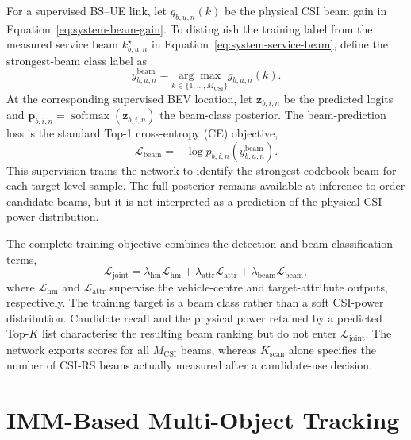 For a supervised BS--UE link, let \(g_{b,u,n}(k)\) be the physical CSI beam gain
in Equation~\eqref{eq:system-beam-gain}.  To distinguish the training label from
the measured service beam \(k^{\star}_{b,u,n}\) in
Equation~\eqref{eq:system-service-beam}, define the strongest-beam class label as
\begin{equation}
    y^{\mathrm{beam}}_{b,u,n}
    =
    \underset{k\in\{1,\ldots,M_{\mathrm{CSI}}\}}{\arg\max}
    g_{b,u,n}(k).
    \label{eq:method-top1-beam-label}
\end{equation}
At the corresponding supervised BEV location, let \(\mathbf{z}_{b,i,n}\) be
the predicted logits and
\(\mathbf{p}_{b,i,n}=\operatorname{softmax}(\mathbf{z}_{b,i,n})\) the
beam-class posterior.  The beam-prediction loss is the standard Top-1
cross-entropy (CE) objective,
\begin{equation}
    \mathcal{L}_{\mathrm{beam}}
    =
    -\log p_{b,i,n}\!\left(y^{\mathrm{beam}}_{b,u,n}\right).
    \label{eq:method-beam-loss}
\end{equation}
This supervision trains the network to identify the strongest codebook beam for
each target-level sample.  The full posterior remains available at inference to
order candidate beams, but it is not interpreted as a prediction of the
physical CSI power distribution.

The complete training objective combines the detection and beam-classification
terms,
\begin{equation}
    \mathcal{L}_{\mathrm{joint}}
    =
    \lambda_{\mathrm{hm}}\mathcal{L}_{\mathrm{hm}}
    +
    \lambda_{\mathrm{attr}}\mathcal{L}_{\mathrm{attr}}
    +
    \lambda_{\mathrm{beam}}\mathcal{L}_{\mathrm{beam}},
    \label{eq:method-joint-loss}
\end{equation}
where \(\mathcal{L}_{\mathrm{hm}}\) and
\(\mathcal{L}_{\mathrm{attr}}\) supervise the vehicle-centre and target-attribute
outputs, respectively.  The training target is a beam class rather than a
soft CSI-power distribution.  Candidate recall and the physical power retained
by a predicted Top-\(K\) list characterise the resulting beam ranking but do not
enter \(\mathcal{L}_{\mathrm{joint}}\).  The network exports scores for all
\(M_{\mathrm{CSI}}\) beams, whereas \(K_{\mathrm{scan}}\) alone specifies the
number of CSI-RS beams actually measured after a candidate-use decision.

\section{IMM-Based Multi-Object Tracking}
\label{sec:method-imm-tracking}

